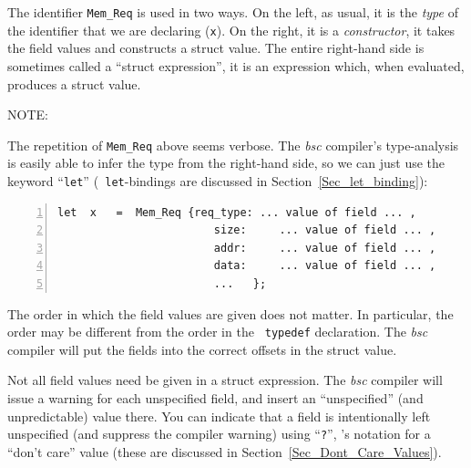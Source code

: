 The identifier {\tt Mem\_Req} is used in two ways.  On the left, as
usual, it is the \emph{type} of the identifier that we are declaring
({\tt x}).  On the right, it is a \emph{constructor}, {\ie} it takes
the field values and constructs a struct value.  The entire right-hand
side is sometimes called a ``struct expression'', {\ie} it is an
expression which, when evaluated, produces a struct value.

\vspace{2ex}

NOTE: 

\vspace{2ex}

The repetition of \verb|Mem_Req| above seems verbose.  The \emph{bsc}
compiler's type-analysis is easily able to infer the type from the
right-hand side, so we can just use the keyword ``\verb|let|'' ({\tt
let}-bindings are discussed in Section~\ref{Sec_let_binding}):


{\footnotesize
\begin{Verbatim}[frame=single, numbers=left]
   let  x   =  Mem_Req {req_type: ... value of field ... ,
                        size:     ... value of field ... ,
                        addr:     ... value of field ... ,
                        data:     ... value of field ... ,
                        ...   };
\end{Verbatim}
}

The order in which the field values are given does not matter.  In
particular, the order may be different from the order in the {\tt
typedef} declaration.  The \emph{bsc} compiler will put the fields
into the correct offsets in the struct value.

Not all field values need be given in a struct expression.  The
\emph{bsc} compiler will issue a warning for each unspecified field,
and insert an ``unspecified'' (and unpredictable) value there.  You
can indicate that a field is intentionally left unspecified (and
suppress the compiler warning) using ``\verb|?|'', {\BSV}'s notation
for a ``don't care'' value (these are discussed in
Section~\ref{Sec_Dont_Care_Values}).

